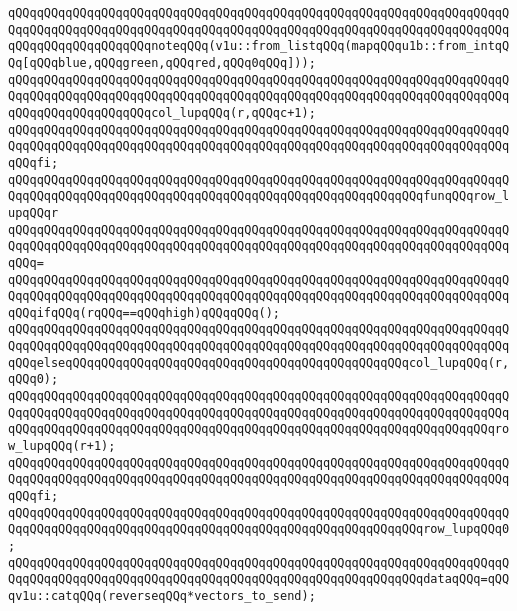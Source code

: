 \verb|qQQqqQQqqQQqqQQqqQQqqQQqqQQqqQQqqQQqqQQqqQQqqQQqqQQqqQQqqQQqqQQqqQQqqQQqqQQqqQQqqQQqqQQqqQQqqQQqqQQqqQQqqQQqqQQqqQQqqQQqqQQqqQQqqQQqqQQqqQQqqQQqqQQqqQQqqQQqqQQqnoteqQQq(v1u::from_listqQQq(mapqQQqu1b::from_intqQQq[qQQqblue,qQQqgreen,qQQqred,qQQq0qQQq]));|\newline
\verb|qQQqqQQqqQQqqQQqqQQqqQQqqQQqqQQqqQQqqQQqqQQqqQQqqQQqqQQqqQQqqQQqqQQqqQQqqQQqqQQqqQQqqQQqqQQqqQQqqQQqqQQqqQQqqQQqqQQqqQQqqQQqqQQqqQQqqQQqqQQqqQQqqQQqqQQqqQQqqQQqcol_lupqQQq(r,qQQqc+1);|\newline
\verb|qQQqqQQqqQQqqQQqqQQqqQQqqQQqqQQqqQQqqQQqqQQqqQQqqQQqqQQqqQQqqQQqqQQqqQQqqQQqqQQqqQQqqQQqqQQqqQQqqQQqqQQqqQQqqQQqqQQqqQQqqQQqqQQqqQQqqQQqqQQqqQQqfi;|\newline
\newline
\verb|qQQqqQQqqQQqqQQqqQQqqQQqqQQqqQQqqQQqqQQqqQQqqQQqqQQqqQQqqQQqqQQqqQQqqQQqqQQqqQQqqQQqqQQqqQQqqQQqqQQqqQQqqQQqqQQqqQQqqQQqqQQqqQQqfunqQQqrow_lupqQQqr|\newline
\verb|qQQqqQQqqQQqqQQqqQQqqQQqqQQqqQQqqQQqqQQqqQQqqQQqqQQqqQQqqQQqqQQqqQQqqQQqqQQqqQQqqQQqqQQqqQQqqQQqqQQqqQQqqQQqqQQqqQQqqQQqqQQqqQQqqQQqqQQqqQQqqQQq=|\newline
\verb|qQQqqQQqqQQqqQQqqQQqqQQqqQQqqQQqqQQqqQQqqQQqqQQqqQQqqQQqqQQqqQQqqQQqqQQqqQQqqQQqqQQqqQQqqQQqqQQqqQQqqQQqqQQqqQQqqQQqqQQqqQQqqQQqqQQqqQQqqQQqqQQqifqQQq(rqQQq==qQQqhigh)qQQqqQQq();|\newline
\verb|qQQqqQQqqQQqqQQqqQQqqQQqqQQqqQQqqQQqqQQqqQQqqQQqqQQqqQQqqQQqqQQqqQQqqQQqqQQqqQQqqQQqqQQqqQQqqQQqqQQqqQQqqQQqqQQqqQQqqQQqqQQqqQQqqQQqqQQqqQQqqQQqelseqQQqqQQqqQQqqQQqqQQqqQQqqQQqqQQqqQQqqQQqqQQqqQQqcol_lupqQQq(r,qQQq0);|\newline
\verb|qQQqqQQqqQQqqQQqqQQqqQQqqQQqqQQqqQQqqQQqqQQqqQQqqQQqqQQqqQQqqQQqqQQqqQQqqQQqqQQqqQQqqQQqqQQqqQQqqQQqqQQqqQQqqQQqqQQqqQQqqQQqqQQqqQQqqQQqqQQqqQQqqQQqqQQqqQQqqQQqqQQqqQQqqQQqqQQqqQQqqQQqqQQqqQQqqQQqqQQqqQQqqQQqrow_lupqQQq(r+1);|\newline
\verb|qQQqqQQqqQQqqQQqqQQqqQQqqQQqqQQqqQQqqQQqqQQqqQQqqQQqqQQqqQQqqQQqqQQqqQQqqQQqqQQqqQQqqQQqqQQqqQQqqQQqqQQqqQQqqQQqqQQqqQQqqQQqqQQqqQQqqQQqqQQqqQQqfi;|\newline
\newline
\verb|qQQqqQQqqQQqqQQqqQQqqQQqqQQqqQQqqQQqqQQqqQQqqQQqqQQqqQQqqQQqqQQqqQQqqQQqqQQqqQQqqQQqqQQqqQQqqQQqqQQqqQQqqQQqqQQqqQQqqQQqqQQqqQQqrow_lupqQQq0;|\newline
\newline
\verb|qQQqqQQqqQQqqQQqqQQqqQQqqQQqqQQqqQQqqQQqqQQqqQQqqQQqqQQqqQQqqQQqqQQqqQQqqQQqqQQqqQQqqQQqqQQqqQQqqQQqqQQqqQQqqQQqqQQqqQQqqQQqqQQqdataqQQq=qQQqv1u::catqQQq(reverseqQQq*vectors_to_send);|\newline
